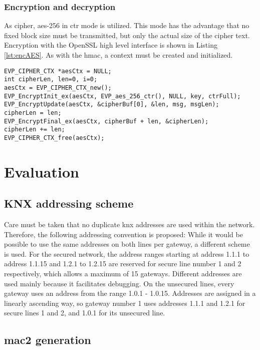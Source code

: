 \subsubsection{Encryption and decryption}
As cipher, \gls{aes}-256 in \gls{ctr} mode is utilized. This mode has the advantage that no fixed block size must be transmitted, but only the actual size of the cipher text.
Encryption with the OpenSSL high level interface is shown in Listing \ref{lst:encAES}. As with the \gls{hmac}, a context must be created and initialized.

\begin{lstlisting}[style=cStyle,caption={\gls{aes} encryption},label=lst:encAES]
EVP_CIPHER_CTX *aesCtx = NULL;
int cipherLen, len=0, i=0;
aesCtx = EVP_CIPHER_CTX_new();
EVP_EncryptInit_ex(aesCtx, EVP_aes_256_ctr(), NULL, key, ctrFull);
EVP_EncryptUpdate(aesCtx, &cipherBuf[0], &len, msg, msgLen);
cipherLen = len;
EVP_EncryptFinal_ex(aesCtx, cipherBuf + len, &cipherLen);
cipherLen += len;
EVP_CIPHER_CTX_free(aesCtx);
\end{lstlisting}

\section{Evaluation}
 
\subsection{KNX addressing scheme}

Care must be taken that no duplicate \gls{knx} addresses are used within the network. Therefore, the following addressing convention is proposed:
While it would be possible to use the same addresses on both lines per gateway, a different scheme is used.
For the secured network, the address ranges starting at address 1.1.1 to address 1.1.15 and 1.2.1 to 1.2.15 are reserved for secure line number
1 and 2 respectively, which allows a maximum of 15 gateways. Different addresses are used mainly because it facilitates debugging. 
On the unsecured lines, every gateway uses an address from the range 1.0.1 - 1.0.15. Addresses are assigned in a linearly ascending way, so gateway number 1
uses addresses 1.1.1 and 1.2.1 for secure lines 1 and 2, and 1.0.1 for its unsecured line.
 
\subsection{\gls{mac2} generation}

